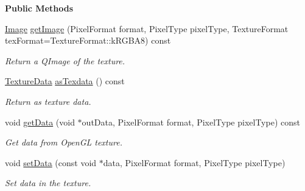 \begin{Indent}\textbf{ Public Methods}\par
\begin{DoxyCompactItemize}
\item 
\mbox{\label{classrev_1_1_texture_aaac56d342bf3683b1cc7cbf77ea7f533}} 
\mbox{\hyperlink{classrev_1_1_image}{Image}} \mbox{\hyperlink{classrev_1_1_texture_aaac56d342bf3683b1cc7cbf77ea7f533}{get\+Image}} (Pixel\+Format format, Pixel\+Type pixel\+Type, Texture\+Format tex\+Format=Texture\+Format\+::k\+R\+G\+B\+A8) const
\begin{DoxyCompactList}\small\item\em Return a Q\+Image of the texture. \end{DoxyCompactList}\item 
\mbox{\label{classrev_1_1_texture_a5cdb57e204c7cc1d2cfdf391751844d5}} 
\mbox{\hyperlink{structrev_1_1_texture_data}{Texture\+Data}} \mbox{\hyperlink{classrev_1_1_texture_a5cdb57e204c7cc1d2cfdf391751844d5}{as\+Texdata}} () const
\begin{DoxyCompactList}\small\item\em Return as texture data. \end{DoxyCompactList}\item 
\mbox{\label{classrev_1_1_texture_a6f138dc148be2885fd18e15689169026}} 
void \mbox{\hyperlink{classrev_1_1_texture_a6f138dc148be2885fd18e15689169026}{get\+Data}} (void $\ast$out\+Data, Pixel\+Format format, Pixel\+Type pixel\+Type) const
\begin{DoxyCompactList}\small\item\em Get data from Open\+GL texture. \end{DoxyCompactList}\item 
\mbox{\label{classrev_1_1_texture_ad9302cb412177bce86cce41d66c9d5e4}} 
void \mbox{\hyperlink{classrev_1_1_texture_ad9302cb412177bce86cce41d66c9d5e4}{set\+Data}} (const void $\ast$data, Pixel\+Format format, Pixel\+Type pixel\+Type)
\begin{DoxyCompactList}\small\item\em Set data in the texture. \end{DoxyCompactList}\item 
\mbox{\label{classrev_1_1_texture_a93784b6ee73a8fa093253e843eeebd9b}} 

\end{DoxyCompactItemize}
\end{Indent}
